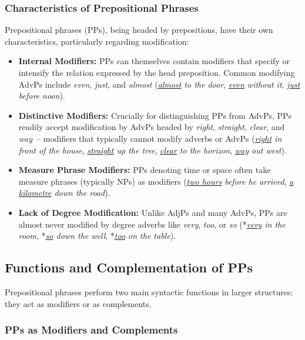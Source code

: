 \subsubsection*{Characteristics of Prepositional Phrases}\label{sec:pp-characteristics}

Prepositional phrases (PPs), being headed by prepositions, have their own characteristics, particularly regarding modification:

\begin{itemize}
    \item \textbf{Internal Modifiers:} PPs can themselves contain modifiers that specify or intensify the relation expressed by the head preposition. Common modifying AdvPs include \textit{even}, \textit{just}, and \textit{almost} (\textit{\uline{almost} to the door}, \textit{\uline{even} without it}, \textit{\uline{just} before noon}).
    \item \textbf{Distinctive Modifiers:} Crucially for distinguishing PPs from AdvPs, PPs readily accept modification by AdvPs headed by \textit{right}, \textit{straight}, \textit{clear}, and \textit{way}~-- modifiers that typically cannot modify adverbs or AdvPs (\textit{\uline{right} in front of the house}, \textit{\uline{straight} up the tree}, \textit{\uline{clear} to the horizon}, \textit{\uline{way} out west}).
    \item \textbf{Measure Phrase Modifiers:} PPs denoting time or space often take measure phrases (typically NPs) as modifiers (\textit{\uline{two hours} before he arrived}, \textit{\uline{a kilometre} down the road}).
    \item \textbf{Lack of Degree Modification:} Unlike AdjPs and many AdvPs, PPs are almost never modified by degree adverbs like \textit{very}, \textit{too}, or \textit{so} (*\textit{\uline{very} in the room}, *\textit{\uline{so} down the well}, *\textit{\uline{too} on the table}).
\end{itemize}

\subsection{Functions and Complementation of PPs}\label{sec:pp-functions-complementation}

Prepositional phrases perform two main syntactic functions in larger structures: they act as modifiers or as complements.

\subsubsection*{PPs as Modifiers and Complements}\label{sec:pps-as-mods-comps}

